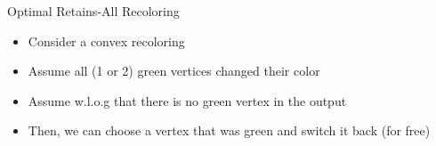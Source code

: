 \begin{frame}{Optimal Retains-All Recoloring}

\begin{itemize}
\item 
Consider a convex recoloring 

\item  
Assume all (1 or 2) green vertices changed their color

\item 
Assume w.l.o.g that there is no green vertex in the output

\item
Then, we can choose a vertex that was green and switch it back (for free)  
\end{itemize}



\end{frame}